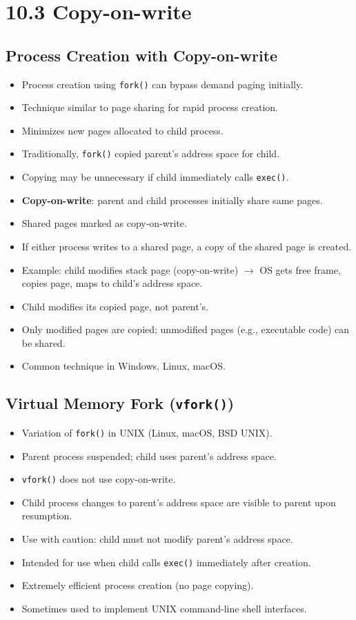 \section{10.3 Copy-on-write}

\subsection{Process Creation with Copy-on-write}
\begin{itemize}
    \item Process creation using \texttt{fork()} can bypass demand paging initially.
    \item Technique similar to page sharing for rapid process creation.
    \item Minimizes new pages allocated to child process.
    \item Traditionally, \texttt{fork()} copied parent's address space for child.
    \item Copying may be unnecessary if child immediately calls \texttt{exec()}.
    \item \textbf{Copy-on-write}: parent and child processes initially share same pages.
    \item Shared pages marked as copy-on-write.
    \item If either process writes to a shared page, a copy of the shared page is created.
    \item Example: child modifies stack page (copy-on-write) $\rightarrow$ OS gets free frame, copies page, maps to child's address space.
    \item Child modifies its copied page, not parent's.
    \item Only modified pages are copied; unmodified pages (e.g., executable code) can be shared.
    \item Common technique in Windows, Linux, macOS.
\end{itemize}

\subsection{Virtual Memory Fork (\texttt{vfork()})}
\begin{itemize}
    \item Variation of \texttt{fork()} in UNIX (Linux, macOS, BSD UNIX).
    \item Parent process suspended; child uses parent's address space.
    \item \texttt{vfork()} does not use copy-on-write.
    \item Child process changes to parent's address space are visible to parent upon resumption.
    \item Use with caution: child must not modify parent's address space.
    \item Intended for use when child calls \texttt{exec()} immediately after creation.
    \item Extremely efficient process creation (no page copying).
    \item Sometimes used to implement UNIX command-line shell interfaces.
\end{itemize}

